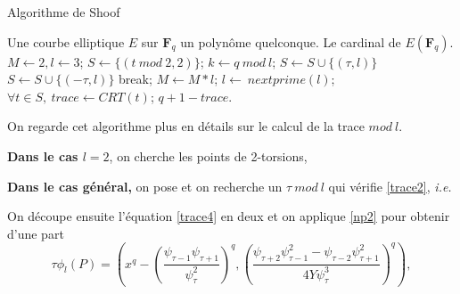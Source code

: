 \documentclass[french, lmodern]{beamer}
\newcommand\fq{\mathbf{F}_{q}}
\newcommand\ie{\textit{i.e.}}
\begin{document}
\begin{frame}
\transwipe
\begin{algorithm}[H]
\caption{Algorithme de Shoof}
\label{schoof1}
\begin{algorithmic} 
\REQUIRE Une courbe elliptique $E$ sur $\fq$ un polynôme quelconque.
\ENSURE Le cardinal de $E(\fq)$.
\STATE $M\leftarrow 2, l\leftarrow 3$;
\STATE $S\leftarrow \{(t\ mod\ 2, 2)\}$; 
    \STATE $k\leftarrow q\ mod\ l$;	
            \STATE $S\leftarrow S\cup \{(\tau, l)\}$ \OR $S\leftarrow S\cup \{(-\tau, l)\}$ 
            \STATE break;
        \ENDIF
    \ENDFOR
    \STATE $M\leftarrow M*l$;
    \STATE $l\leftarrow\ nextprime(l)$; 	
\ENDWHILE
\STATE $\forall t\in S,\ trace\leftarrow CRT(t)$; 
\RETURN $q + 1 - trace$.
\end{algorithmic}
\end{algorithm}
\end{frame}


\begin{frame}
\transwipe
On regarde cet algorithme plus en détails sur le calcul de la trace $mod\ l$.
\pause

\textbf{Dans le cas $l = 2$}, on cherche les points de 2-torsions, 
\pause

\textbf{Dans le cas général,} on pose  et on recherche un $\tau\ mod\ l$ qui vérifie \eqref{trace2}, \ie 
{}
\pause

On découpe ensuite l'équation \eqref{trace4} en deux et on applique \eqref{np2} pour obtenir d'une part 
\begin{equation}
\tau\phi_{l}(P) = \left(x^{q} - \left(\dfrac{\psi_{\tau - 1}\psi_{\tau + 1}}{\psi_{\tau}^{2}}\right)^{q}, \left(\dfrac{\psi_{\tau + 2}\psi_{\tau - 1}^{2} - \psi_{\tau - 2}\psi_{\tau + 1}^{2}}{4Y\psi_{\tau}^{3}}\right)^{q}\right),
\label{tauphi}
\end{equation} 
\end{frame}
\end{document}
